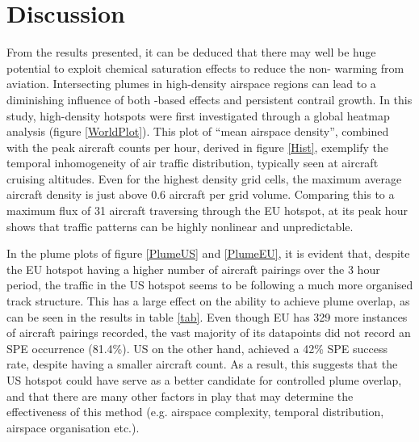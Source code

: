 \section{Discussion}
From the results presented, it can be deduced that there may well be huge potential to exploit chemical saturation effects to reduce the non- warming from aviation. Intersecting plumes in high-density airspace regions can lead to a diminishing influence of both -based effects and persistent contrail growth. In this study, high-density hotspots were first investigated through a global heatmap analysis (figure \ref{WorldPlot}). This plot of ``mean airspace density'', combined with the peak aircraft counts per hour, derived in figure \ref{Hist}, exemplify the temporal inhomogeneity of air traffic distribution, typically seen at aircraft cruising altitudes. Even for the highest density grid cells, the maximum average aircraft density is just above 0.6 aircraft per grid volume. Comparing this to a maximum flux of 31 aircraft traversing through the EU hotspot, at its peak hour shows that traffic patterns can be highly nonlinear and unpredictable.

In the plume plots of figure \ref{PlumeUS} and \ref{PlumeEU}, it is evident that, despite the EU hotspot having a higher number of aircraft pairings over the 3 hour period, the traffic in the US hotspot seems to be following a much more organised track structure. This has a large effect on the ability to achieve plume overlap, as can be seen in the results in table \ref{tab}. Even though EU has 329 more instances of aircraft pairings recorded, the vast majority of its datapoints did not record an SPE occurrence (81.4\%). US on the other hand, achieved a 42\% SPE success rate, despite having a smaller aircraft count. As a result, this suggests that the US hotspot could have serve as a better candidate for controlled plume overlap, and that there are many other factors in play that may determine the effectiveness of this method (e.g. airspace complexity, temporal distribution, airspace organisation etc.).